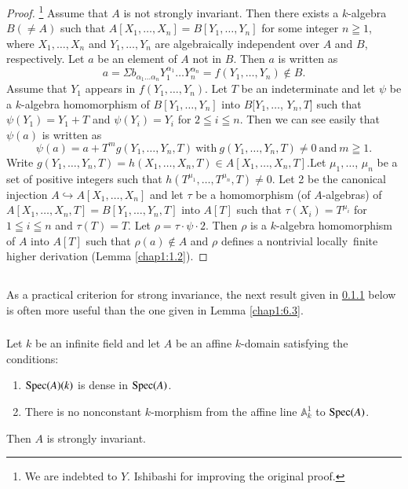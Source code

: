 \begin{proof}
\footnote{We are indebted to $Y$. Ishibashi for improving the original
proof.} 
Assume that $A$ is not strongly invariant. Then there exists a
$k$-algebra $B(\neq A)$ such that
$A[X_{1},\ldots,X_{n}]=B[Y_{1},\ldots,Y_{n}]$ for some integer $n\geqq
1$, where $X_{1},\ldots,X_{n}$ and $Y_{1},\ldots,Y_{n}$ are
algebraically independent over $A$ and $B$, respectively. Let $a$ be
an element of $A$ not in $B$. Then $a$ is written as
$$
a=\Sigma b_{\alpha_{1}\ldots\alpha_{n}}Y^{\alpha_{1}}_{1}\ldots
Y^{\alpha_{n}}_{n}=f(Y_{1},\ldots,Y_{n})\not\in B.
$$
Assume that $Y_{1}$ appears in $f(Y_{1},\ldots,Y_{n})$. Let $T$ be an
indeterminate and let $\psi$ be a $k$-algebra homomorphism of
$B[Y_{1},\ldots,Y_{n}]$ into $B[Y_{1},\ldots$, $Y_{n},T]$ such that
$\psi(Y_{1})=Y_{1}+T$ and $\psi(Y_{i})=Y_{i}$ for $2\leqq i\leqq
n$. Then we can see easily that $\psi(a)$ is written as
$$
\psi(a)=a+T^{m}g(Y_{1},\ldots,Y_{n},T)~\text{with}~
g(Y_{1},\ldots,Y_{n},T)\neq 0~\text{and}~ m\geqq 1.
$$
Write $g(Y_{1},\ldots,Y_{n},T)=h(X_{1},\ldots,X_{n},T)\in
A[X_{1},\ldots,X_{n},T]$.\break Let $\mu_{1},\ldots$, $\mu_{n}$ be a set of
positive integers such that $h(T^{\mu_{1}},\ldots,T^{\mu_{n}},T)\neq
0$. Let 2 be the canonical injection $A\hookrightarrow
A[X_{1},\ldots,X_{n}]$ and let $\tau$ be a homomorphism (of
$A$-algebras) of $A[X_{1},\ldots,X_{n},T]=B[Y_{1},\ldots,Y_{n},T]$
into $A[T]$ such that $\tau(X_{i})=T^{\mu_{i}}$ for $1\leqq i\leqq n$
and $\tau(T)=T$. Let $\rho=\tau\cdot\psi\cdot 2$. Then $\rho$ is a
$k$-algebra homomorphism of $A$ into $A[T]$ such that $\rho(a)\not\in
A$ and $\rho$ defines a nontrivial locally\pageoriginale\ finite higher derivation
(\cf Lemma \ref{chap1:1.2}).
\end{proof}

\subsection{}\label{chap1:6.4}
As a practical criterion for strong invariance, the next result given
in \ref{chap1:6.4.1} below is often more useful than the one given in Lemma
\ref{chap1:6.3}. 

\subsubsection{}\label{chap1:6.4.1}
\begin{lemma*}
  Let $k$ be an infinite field and let $A$ be an affine $k$-domain
  satisfying the conditions:
  \begin{enumerate}
    \renewcommand{\labelenumi}{\rm (\theenumi)}
  \item $\operatorname{Spec}(A)(k)$ is dense in $\operatorname{Spec} (A)$.
    
  \item There is no nonconstant $k$-morphism from the affine line
    $\mathbb{A}^{1}_{k}$ to $\operatorname{Spec} (A)$.
  \end{enumerate}
  Then $A$ is strongly invariant.
\end{lemma*}

